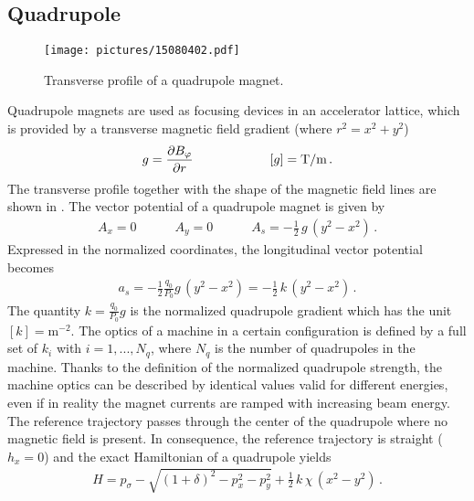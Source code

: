 \subsection{Quadrupole}
  \begin{figure}[b]
  \centering
  \texttt{[image: pictures/15080402.pdf]}
  \caption{Transverse profile of a quadrupole magnet. }  
  \label{pic:15080402}
  \end{figure}
Quadrupole magnets are used as focusing devices in an accelerator lattice, which is provided by a transverse magnetic field gradient (where $r^2 = x^2 + y^2$)
\begin{align}
g = \frac{\partial B_\varphi}{\partial r} \quad \quad \quad \quad \quad \quad [g] = \text{T}/\text{m}\, .
\end{align}
%
The transverse profile together with the shape of the magnetic field lines are shown in . The vector potential of a quadrupole magnet is given by
\begin{align}
A_x = 0 \quad \quad \quad A_y = 0 \quad \quad \quad A_s = - \frac{1}{2} \, g \, (y^2 -x^2) \, .
\end{align}
%
Expressed in the normalized coordinates, the longitudinal vector potential becomes
%
\begin{align}
a_s = - \frac{1}{2} \frac{q_0}{P_0} g  \, (y^2 -x^2)  = - \frac{1}{2} \, k \,  (y^2 -x^2) \, .
\end{align}
The quantity $k=\frac{q_0}{P_0} g$ is the normalized quadrupole gradient which has the unit $[k] = \text{m}^{-2}$. The optics of a machine in a certain configuration is defined by a full set of $k_i$ with $i= 1,...,N_q$, where $N_q$ is the number of quadrupoles in the machine. Thanks to the definition of the normalized quadrupole strength, the machine optics can be described by identical values valid for different energies, even if in reality the magnet currents are ramped with increasing beam energy. The reference trajectory passes through the center of the quadrupole where no magnetic field is present. In consequence, the reference trajectory is straight ($h_x=0$) and the exact Hamiltonian of a quadrupole yields	
\begin{align}
H = p_\sigma - \sqrt{(1+\delta)^2 - p_x^2 -p_y^2} + \frac{1}{2} \, k \, \chi\, (x^2 -y^2) \, .
\end{align}

